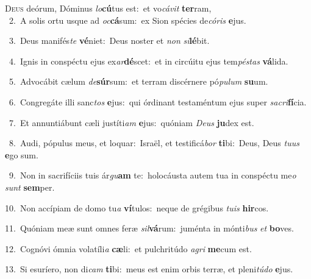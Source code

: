 \lettrine{\initial\textcolor{\initialcolor}{D}}{eus} deórum, Dóminus \textit{lo}\-\textbf{cú}tus est:~\star et vo\-\textit{cá}\-\textit{vit} \textbf{ter}\-ram,\\
{\numbfont\textcolor{\numbcolor}{~2.}}~A solis ortu usque ad \textit{oc}\-\textbf{cá}sum:~\star ex Sion spécies de\-\textit{có}\-\textit{ris} \textbf{e}\-jus.\par
{\numbfont\textcolor{\numbcolor}{~3.}}~Deus manifés\textit{te} \textbf{vé}\-niet:~\star Deus noster et \textit{non} \textit{si}\-\textbf{lé}bit.\par
{\numbfont\textcolor{\numbcolor}{~4.}}~Ignis in conspéctu ejus ex\-\textit{ar}\-\textbf{dé}scet:~\star et in circúitu ejus tem\-\textit{pés}\-\textit{tas} \textbf{vá}\-lida.\par
{\numbfont\textcolor{\numbcolor}{~5.}}~Advocábit cælum \textit{de}\-\textbf{súr}sum:~\star et terram discérnere pó\-\textit{pu}\-\textit{lum} \textbf{su}\-um.\par
{\numbfont\textcolor{\numbcolor}{~6.}}~Congregáte illi sanc\textit{tos} \textbf{e}\-jus:~\star qui órdinant testaméntum ejus super \textit{sa}\-\textit{cri}\textbf{fí}cia.\par
{\numbfont\textcolor{\numbcolor}{~7.}}~Et annuntiábunt cæli justíti\textit{am} \textbf{e}\-jus:~\star quóniam \textit{De}\-\textit{us} \textbf{ju}\-dex est.\par
{\numbfont\textcolor{\numbcolor}{~8.}}~Audi, pópulus meus, et loquar:~\dagger Israël, et testificá\textit{bor} \textbf{ti}\-bi:~\star Deus, Deus \textit{tu}\-\textit{us} \textbf{e}\-go sum.\par
{\numbfont\textcolor{\numbcolor}{~9.}}~Non in sacrifíciis tuis ár\-\textit{gu}\-\textbf{am} te:~\star holocáusta autem tua in conspéctu me\textit{o} \textit{sunt} \textbf{sem}\-per.\par
{\numbfont\textcolor{\numbcolor}{10.}}~Non accípiam de domo tu\textit{a} \textbf{ví}\-tulos:~\star neque de grégibus \textit{tu}\-\textit{is} \textbf{hir}\-cos.\par
{\numbfont\textcolor{\numbcolor}{11.}}~Quóniam meæ sunt omnes feræ \textit{sil}\-\textbf{vá}rum:~\star juménta in mónti\textit{bus} \textit{et} \textbf{bo}\-ves.\par
{\numbfont\textcolor{\numbcolor}{12.}}~Cognóvi ómnia volatíli\textit{a} \textbf{cæ}\-li:~\star et pulchritúdo \textit{a}\-\textit{gri} \textbf{me}\-cum est.\par
{\numbfont\textcolor{\numbcolor}{13.}}~Si esuríero, non di\textit{cam} \textbf{ti}\-bi:~\star meus est enim orbis terræ, et pleni\-\textit{tú}\-\textit{do} \textbf{e}\-jus.\par
